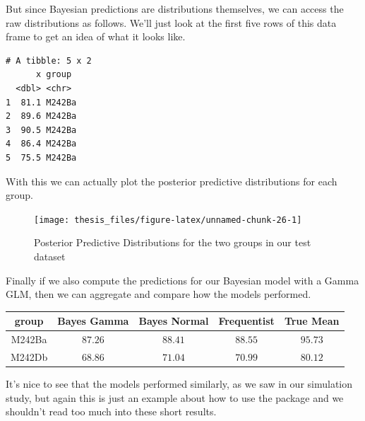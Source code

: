 \documentclass[12pt,twoside]{reedthesis}
\newenvironment{Shaded}{\begin{snugshade}}{\end{snugshade}}
\newcommand{\AttributeTok}[1]{\textcolor[rgb]{0.77,0.63,0.00}{#1}}
\newcommand{\ConstantTok}[1]{\textcolor[rgb]{0.00,0.00,0.00}{#1}}
\newcommand{\DecValTok}[1]{\textcolor[rgb]{0.00,0.00,0.81}{#1}}
\newcommand{\FloatTok}[1]{\textcolor[rgb]{0.00,0.00,0.81}{#1}}
\newcommand{\FunctionTok}[1]{\textcolor[rgb]{0.00,0.00,0.00}{#1}}
\newcommand{\NormalTok}[1]{#1}
\newcommand{\SpecialCharTok}[1]{\textcolor[rgb]{0.00,0.00,0.00}{#1}}
\begin{document}
But since Bayesian predictions are distributions themselves, we can access the raw distributions as follows. We'll just look at the first five rows of this data frame to get an idea of what it looks like.
\begin{Shaded}
\end{Shaded}
\begin{verbatim}
# A tibble: 5 x 2
      x group 
  <dbl> <chr> 
1  81.1 M242Ba
2  89.6 M242Ba
3  90.5 M242Ba
4  86.4 M242Ba
5  75.5 M242Ba
\end{verbatim}
With this we can actually plot the posterior predictive distributions for each group.
\begin{Shaded}
\end{Shaded}
\begin{figure}

{\centering \texttt{[image: thesis\_files/figure-latex/unnamed-chunk-26-1]} 

}

\caption{Posterior Predictive Distributions for the two groups in our test dataset}\label{fig:unnamed-chunk-26}
\end{figure}
Finally if we also compute the predictions for our Bayesian model with a Gamma GLM, then we can aggregate and compare how the models performed.
\begin{longtable}{ccccc}
\toprule
group & Bayes Gamma & Bayes Normal & Frequentist & True Mean \\ 
\midrule
M242Ba & $87.26$ & $88.41$ & $88.55$ & $95.73$ \\ 
M242Db & $68.86$ & $71.04$ & $70.99$ & $80.12$ \\ 
\bottomrule
\end{longtable}
It's nice to see that the models performed similarly, as we saw in our simulation study, but again this is just an example about how to use the package and we shouldn't read too much into these short results.
\end{document}
